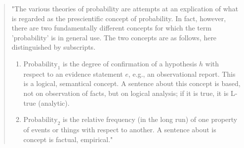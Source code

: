 \documentclass[
]{report}
\theoremstyle{definition}
\begin{document}
\begin{quote}
"The various theories of probability are attempts at an explication of what is regarded as the prescientific concept of probability. In fact, however, there are two fundamentally different concepts for which the term 'probability' is in general use. The two concepts are as follows, here distinguished by subscripts.
\begin{enumerate}[label=(\arabic*)]
  \item $\text{Probability}_1$ is the degree of confirmation of a hypothesis $h$ with respect to an evidence statement $e$, e.g., an observational report. This is a logical, semantical concept. A sentence about this concept is based, not on observation of facts, but on logical analysis; if it is true, it is L-true (analytic).
  \item $\text{Probability}_2$ is the relative frequency (in the long run) of one property of events or things with respect to another. A sentence about is concept is factual, empirical." \cite{carnap_logical_1950}
\end{enumerate}
\end{quote}
\end{document}

